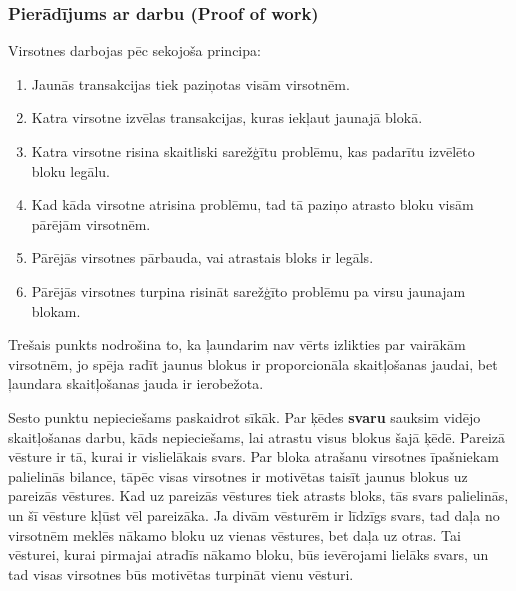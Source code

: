 \subsubsection{Pierādījums ar darbu (Proof of work)}
Virsotnes darbojas pēc sekojoša principa:\cite{nakamoto08}
\begin{enumerate}
    \item Jaunās transakcijas tiek paziņotas visām virsotnēm.
    \item Katra virsotne izvēlas transakcijas, kuras iekļaut jaunajā blokā.
    \item Katra virsotne risina skaitliski sarežģītu problēmu, kas padarītu izvēlēto bloku legālu.
    \item Kad kāda virsotne atrisina problēmu, tad tā paziņo atrasto bloku visām pārējām virsotnēm.
    \item Pārējās virsotnes pārbauda, vai atrastais bloks ir legāls.
    \item Pārējās virsotnes turpina risināt sarežģīto problēmu pa virsu jaunajam blokam.
\end{enumerate}
Trešais punkts nodrošina to, ka ļaundarim nav vērts izlikties par vairākām virsotnēm, jo spēja radīt jaunus blokus ir proporcionāla skaitļošanas jaudai, bet ļaundara skaitļošanas jauda ir ierobežota.

Sesto punktu nepieciešams paskaidrot sīkāk. Par ķēdes \textbf{svaru} sauksim vidējo skaitļošanas darbu, kāds nepieciešams, lai atrastu visus blokus šajā ķēdē. Pareizā vēsture ir tā, kurai ir vislielākais svars. Par bloka atrašanu virsotnes īpašniekam palielinās bilance, tāpēc visas virsotnes ir motivētas taisīt jaunus blokus uz pareizās vēstures. Kad uz pareizās vēstures tiek atrasts bloks, tās svars palielinās, un šī vēsture kļūst vēl pareizāka. Ja divām vēsturēm ir līdzīgs svars, tad daļa no virsotnēm meklēs nākamo bloku uz vienas vēstures, bet daļa uz otras. Tai vēsturei, kurai pirmajai atradīs nākamo bloku, būs ievērojami lielāks svars, un tad visas virsotnes būs motivētas turpināt vienu vēsturi.

